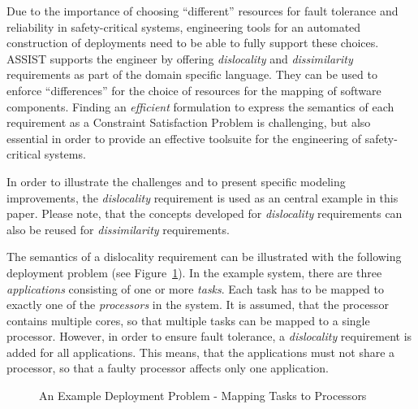\documentclass[english,biblatex]{lni}
\begin{document}
Due to the importance of choosing  ``different'' resources for fault tolerance and reliability in safety-critical systems, engineering tools for an automated construction of deployments need to be able to fully support these choices.
ASSIST supports the engineer by offering \emph{dislocality} and \emph{dissimilarity} requirements as part of the domain specific language.
They can be used to enforce ``differences'' for the choice of resources for the mapping of software components.
Finding an \emph{efficient} formulation to express the semantics of each requirement as a Constraint Satisfaction Problem is challenging, but also essential in order to provide an effective toolsuite for the engineering of safety-critical systems.

In order to illustrate the challenges and to present specific modeling improvements, the \emph{dislocality} requirement is used as an central example in this paper.
Please note, that the concepts developed for \emph{dislocality} requirements can also be reused for \emph{dissimilarity} requirements.

The semantics of a dislocality requirement can be illustrated with the following deployment problem (see Figure~\ref{example}).
In the example system, there are three \emph{applications} consisting of one or more \emph{tasks}.
Each task has to be mapped to exactly one of the \emph{processors} in the system.
It is assumed, that the processor contains multiple cores, so that multiple tasks can be mapped to a single processor.
However, in order to ensure fault tolerance, a \emph{dislocality} requirement is added for all applications.
This means, that the applications must not share a processor, so that a faulty processor affects only one application.

\begin{figure}
\centering
{}%
\hfill
{}%
\caption{An Example Deployment Problem - Mapping Tasks to Processors}
\label{example}
\end{figure}
\end{document}
